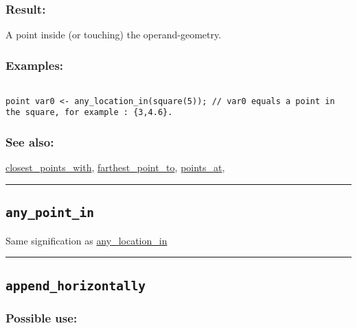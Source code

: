 \documentclass[]{book}
\theoremstyle{definition}
\theoremstyle{definition}
\theoremstyle{definition}
\theoremstyle{remark}
\begin{document}
\subsubsection{Result:}\label{result-37}

A point inside (or touching) the operand-geometry.

\subsubsection{Examples:}\label{examples-30}

\begin{verbatim}
 
point var0 <- any_location_in(square(5)); // var0 equals a point in the square, for example : {3,4.6}.
\end{verbatim}

\subsubsection{See also:}\label{see-also-26}

\href{OperatorsBC\#closest_points_with}{closest\_points\_with},
\href{OperatorsDH\#farthest_point_to}{farthest\_point\_to},
\href{OperatorsNR\#points_at}{points\_at},

\begin{center}\rule{0.5\linewidth}{\linethickness}\end{center}

\subsection{\texorpdfstring{\texttt{any\_point\_in}}{any\_point\_in}}\label{any_point_in}

Same signification as
\href{OperatorsAA\#any_location_in}{any\_location\_in}

\begin{center}\rule{0.5\linewidth}{\linethickness}\end{center}

\subsection{\texorpdfstring{\texttt{append\_horizontally}}{append\_horizontally}}\label{append_horizontally}

\subsubsection{Possible use:}\label{possible-use-39}
\end{document}
